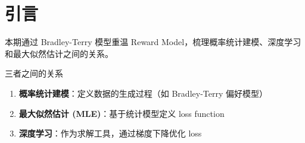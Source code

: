 \section{引言}
本期通过 Bradley-Terry 模型重温 Reward Model，梳理概率统计建模、深度学习和最大似然估计之间的关系。

\begin{importantbox}{三者之间的关系}
\begin{enumerate}
  \item \textbf{概率统计建模}：定义数据的生成过程（如 Bradley-Terry 偏好模型）
  \item \textbf{最大似然估计 (MLE)}：基于统计模型定义 loss function
  \item \textbf{深度学习}：作为求解工具，通过梯度下降优化 loss
\end{enumerate}
\end{importantbox}

